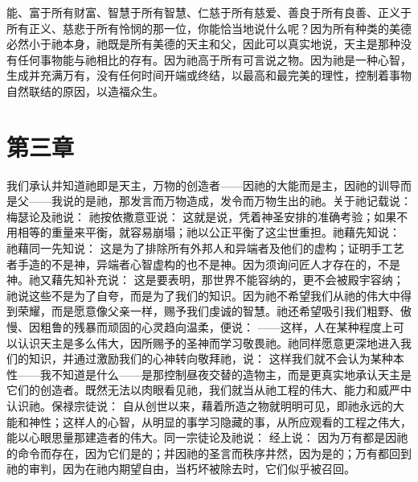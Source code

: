 能、富于所有财富、智慧于所有智慧、仁慈于所有慈爱、善良于所有良善、正义于所有正义、慈悲于所有怜悯的那一位，你能恰当地说什么呢？因为所有种类的美德必然小于祂本身，祂既是所有美德的天主和父，因此可以真实地说，天主是那种没有任何事物能与祂相比的存有。因为祂高于所有可言说之物。因为祂是一种心智，生成并充满万有，没有任何时间开端或终结，以最高和最完美的理性，控制着事物自然联结的原因，以造福众生。\par


\section{第三章}

\par

我们承认并知道祂即是天主，万物的创造者——因祂的大能而是主，因祂的训导而是父——我说的是祂，那发言而万物造成，发令而万物生出的祂。关于祂记载说： 梅瑟论及祂说：  祂按依撒意亚说：  这就是说，凭着神圣安排的准确考验；如果不用相等的重量来平衡，就容易崩塌；祂以公正平衡了这尘世重担。祂藉先知说：  祂藉同一先知说：  这是为了排除所有外邦人和异端者及他们的虚构；证明手工艺者手造的不是神，异端者心智虚构的也不是神。因为须询问匠人才存在的，不是神。祂又藉先知补充说： 这是要表明，那世界不能容纳的，更不会被殿宇容纳；祂说这些不是为了自夸，而是为了我们的知识。因为祂不希望我们从祂的伟大中得到荣耀，而是愿意像父亲一样，赐予我们虔诚的智慧。祂还希望吸引我们粗野、傲慢、因粗鲁的残暴而顽固的心灵趋向温柔，便说：  ——这样，人在某种程度上可以认识天主是多么伟大，因所赐予的圣神而学习敬畏祂。祂同样愿意更深地进入我们的知识，并通过激励我们的心神转向敬拜祂，说： 这样我们就不会认为某种本性——我不知道是什么——是那控制昼夜交替的造物主，而是更真实地承认天主是它们的创造者。既然无法以肉眼看见祂，我们就当从祂工程的伟大、能力和威严中认识祂。保禄宗徒说： 自从创世以来，藉着所造之物就明明可见，即祂永远的大能和神性；这样人的心智，从明显的事学习隐藏的事，从所应观看的工程之伟大，能以心眼思量那建造者的伟大。同一宗徒论及祂说：  经上说：  因为万有都是因祂的命令而存在，因为它们是的；并因祂的圣言而秩序井然，因为是的；万有都回到祂的审判，因为在祂内期望自由，当朽坏被除去时，它们似乎被召回。\par

